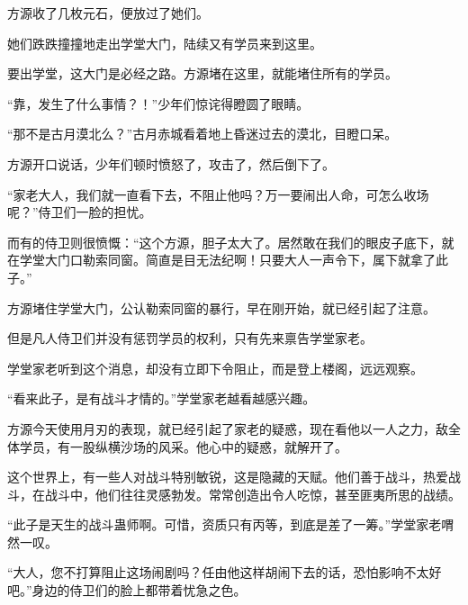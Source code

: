 \begin{this_body}
方源收了几枚元石，便放过了她们。

她们跌跌撞撞地走出学堂大门，陆续又有学员来到这里。

要出学堂，这大门是必经之路。方源堵在这里，就能堵住所有的学员。

“靠，发生了什么事情？！”少年们惊诧得瞪圆了眼睛。

“那不是古月漠北么？”古月赤城看着地上昏迷过去的漠北，目瞪口呆。

方源开口说话，少年们顿时愤怒了，攻击了，然后倒下了。

“家老大人，我们就一直看下去，不阻止他吗？万一要闹出人命，可怎么收场呢？”侍卫们一脸的担忧。

而有的侍卫则很愤慨：“这个方源，胆子太大了。居然敢在我们的眼皮子底下，就在学堂大门口勒索同窗。简直是目无法纪啊！只要大人一声令下，属下就拿了此子。”

方源堵住学堂大门，公认勒索同窗的暴行，早在刚开始，就已经引起了注意。

但是凡人侍卫们并没有惩罚学员的权利，只有先来禀告学堂家老。

学堂家老听到这个消息，却没有立即下令阻止，而是登上楼阁，远远观察。

“看来此子，是有战斗才情的。”学堂家老越看越感兴趣。

方源今天使用月刃的表现，就已经引起了家老的疑惑，现在看他以一人之力，敌全体学员，有一股纵横沙场的风采。他心中的疑惑，就解开了。

这个世界上，有一些人对战斗特别敏锐，这是隐藏的天赋。他们善于战斗，热爱战斗，在战斗中，他们往往灵感勃发。常常创造出令人吃惊，甚至匪夷所思的战绩。

“此子是天生的战斗蛊师啊。可惜，资质只有丙等，到底是差了一筹。”学堂家老喟然一叹。

“大人，您不打算阻止这场闹剧吗？任由他这样胡闹下去的话，恐怕影响不太好吧。”身边的侍卫们的脸上都带着忧急之色。

\end{this_body}

